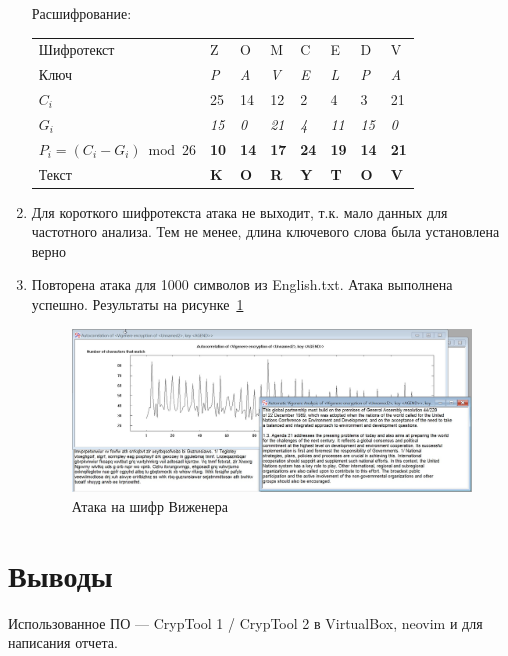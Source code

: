 \documentclass[a4paper, 14pt]{extarticle}
\begin{document}
\begin{enumerate}
    \FloatBarrier{}
    Расшифрование:
    \begin{table}[h]
        \centering
        \begin{tabular}{@{}llllllll@{}}
        \toprule
        Шифротекст & Z & O & M & C & E & D & V \\
        Ключ & \textit{P} & \textit{A} & \textit{V} & \textit{E} & \textit{L} & \textit{P} & \textit{A} \\ \midrule
        $C_i$ & 25 & 14 & 12 & 2 & 4 & 3 & 21 \\
        $G_i$ & \textit{15} & \textit{0} & \textit{21} & \textit{4} & \textit{11} & \textit{15} & \textit{0} \\ \midrule
        $P_i = (C_i - G_i) \bmod 26$ & \textbf{10} & \textbf{14} & \textbf{17} & \textbf{24} & \textbf{19} & \textbf{14} & \textbf{21} \\
        Текст & \textbf{K} & \textbf{O} & \textbf{R} & \textbf{Y} & \textbf{T} & \textbf{O} & \textbf{V} \\
        \bottomrule
        \end{tabular}
    \end{table}
    \item Для короткого шифротекста атака не выходит, т.к. мало данных для частотного анализа. Тем не менее, длина ключевого слова была установлена верно
    \item Повторена атака для 1000 символов из English.txt. Атака выполнена успешно. Результаты на рисунке~\ref{img:3:2}
    \begin{figure}[h]
        \centering
        \includegraphics[width=\textwidth]{./img/S011.jpg}
        \caption{Атака на шифр Виженера}%
        \label{img:3:2}
    \end{figure}
    
\end{enumerate}

\section*{Выводы}

Использованное ПО --- CrypTool 1 / CrypTool 2 в VirtualBox, neovim и \XeLaTeX{} для написания отчета.
\end{document}
